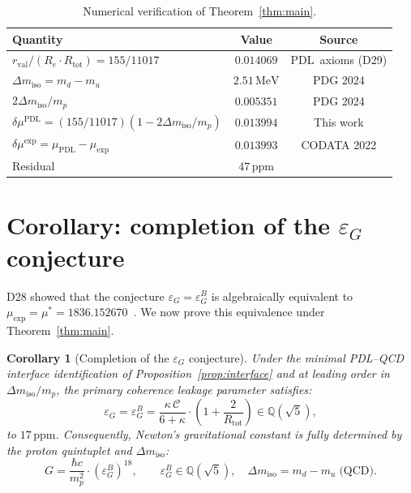 \documentclass[11pt,a4paper]{article}
\newtheorem{corollary}[theorem]{Corollary}
\theoremstyle{definition}
\newcommand{\PDL}{\textnormal{PDL}}
\newcommand{\Rtot}{R_{\mathrm{tot}}}
\newcommand{\rval}{r_{\mathrm{val}}}
\newcommand{\epsg}{\varepsilon_G}
\newcommand{\epsgB}{\varepsilon_G^B}
\newcommand{\muPDL}{\mu_{\mathrm{PDL}}}
\newcommand{\muexp}{\mu_{\mathrm{exp}}}
\newcommand{\mustar}{\mu^*}
\newcommand{\dmu}{\delta\mu}
\newcommand{\dmiso}{\Delta m_{\mathrm{iso}}}
\newcommand{\Ree}{R_e}
\newcommand{\kap}{\kappa}
\newcommand{\calC}{\mathcal{C}}
\begin{document}
\begin{table}[ht]
\centering
\caption{Numerical verification of Theorem~\ref{thm:main}.}
\label{tab:verification}
\bigskip
\begin{tabular}{lcc}
\toprule
Quantity & Value & Source \\
\midrule
$\rval/(\Ree\cdot\Rtot) = 155/11017$ & $0.014069$ & \PDL\ axioms (D29) \\
$\dmiso = m_d - m_u$ & $2.51\,\mathrm{MeV}$ & PDG 2024 \\
$2\dmiso/m_p$ & $0.005351$ & PDG 2024 \\
$\dmu^{\mathrm{PDL}} = (155/11017)(1-2\dmiso/m_p)$ & $0.013994$ & This work \\
$\dmu^{\mathrm{exp}} = \muPDL - \muexp$ & $0.013993$ & CODATA 2022 \\
Residual & $47\,\mathrm{ppm}$ & \\
\bottomrule
\end{tabular}
\end{table}

\section{Corollary: completion of the \texorpdfstring{$\epsg$}{epsilon\_G} conjecture}
\label{sec:corollary}

D28 showed that the conjecture $\epsg = \epsgB$ is algebraically equivalent to $\muexp = \mustar = 1836.152670$~\cite{PDL_D28_2026}. We now prove this equivalence under Theorem~\ref{thm:main}.

\begin{corollary}[Completion of the $\epsg$ conjecture]
\label{cor:epsG}
Under the minimal \PDL--QCD interface identification of Proposition~\ref{prop:interface} and at leading order in $\dmiso/m_p$, the primary coherence leakage parameter satisfies:
\begin{equation}
\epsg = \epsgB = \frac{\kap\,\calC}{6+\kap}\cdot\left(1+\frac{2}{\Rtot}\right) \in \mathbb{Q}(\sqrt{5}),
\label{eq:epsG_proved}
\end{equation}
to $17\,\mathrm{ppm}$. Consequently, Newton's gravitational constant is fully determined by the proton quintuplet and $\dmiso$:
\begin{equation}
G = \frac{\hbar c}{m_p^2}\cdot(\epsgB)^{18},\qquad \epsgB \in \mathbb{Q}(\sqrt{5}),\quad \dmiso = m_d - m_u\;\text{(QCD)}.
\label{eq:G_combinatorial}
\end{equation}
\end{corollary}
\end{document}
